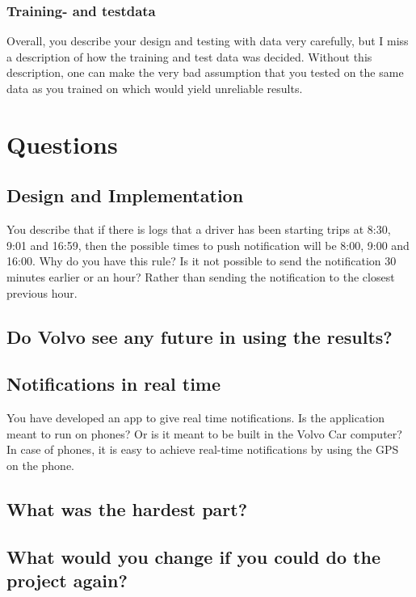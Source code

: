 \documentclass[
10pt, %
a4paper, %
oneside, %
headinclude,footinclude, %
BCOR5mm, %
]{scrartcl}
\begin{document}
{\subsubsection*{Training- and testdata}
Overall, you describe your design and testing with data very carefully, but I miss a description of how the training and test data was decided. Without this description, one can make the very bad assumption that you tested on the same data as you trained on which would yield unreliable results.

\section*{Questions}
\subsection*{Design and Implementation}
You describe that if there is logs that a driver has been starting trips at 8:30, 9:01 and 16:59, then the possible times to push notification will be 8:00, 9:00 and 16:00. Why do you have this rule? Is it not possible to send the notification 30 minutes earlier or an hour? Rather than sending the notification to the closest previous hour.

\subsection*{Do Volvo see any future in using the results?}

\subsection*{Notifications in real time}
You have developed an app to give real time notifications. Is the application meant to run on phones? Or is it meant to be built in the Volvo Car computer?
\newline
\newline
In case of phones, it is easy to achieve real-time notifications by using the GPS on the phone.

\subsection*{What was the hardest part?}
\subsection*{What would you change if you could do the project again?}

}
\end{document}
